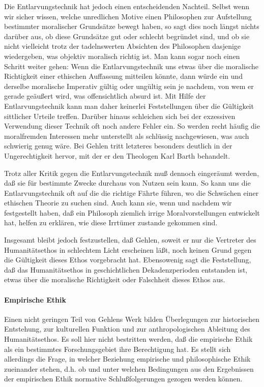 \documentclass[12pt,a4paper]{article}
\begin{document}
Die Entlarvungstechnik hat jedoch einen entscheidenden Nachteil. Selbst
wenn wir sicher wissen, welche unredlichen Motive einen Philosophen zur
Aufstellung bestimmter moralischer Grundsätze bewegt haben, so sagt dies
noch längst nichts darüber aus, ob diese Grundsätze gut oder schlecht
begründet sind, und ob sie nicht vielleicht trotz der tadelnswerten
Absichten des Philosophen dasjenige wiedergeben, was objektiv moralisch
richtig ist. Man kann sogar noch einen Schritt weiter gehen: Wenn die
Entlarvungstechnik uns etwas über die moralische Richtigkeit einer
ethischen Auffassung mitteilen könnte, dann würde ein und derselbe
moralische Imperativ gültig oder ungültig sein je nachdem, von wem er
gerade geäußert wird, was offensichtlich absurd ist. Mit Hilfe der
Entlarvungstechnik kann man daher keinerlei Feststellungen über die
Gültigkeit sittlicher Urteile treffen.  Darüber hinaus schleichen sich
bei der exzessiven Verwendung dieser Technik oft noch andere Fehler ein.
So werden recht häufig die moralfremden Interessen mehr unterstellt als
schlüssig nachgewiesen, was auch schwierig genug wäre. Bei Gehlen tritt
letzteres besonders deutlich in der Ungerechtigkeit hervor, mit der er
den Theologen Karl Barth behandelt.

Trotz aller Kritik gegen die Entlarvungstechnik muß dennoch eingeräumt
werden, daß sie für bestimmte Zwecke durchaus von Nutzen sein kann. So kann
uns die Entlarvungstechnik oft auf die die richtige Fährte führen, wo die
Schwächen einer ethischen Theorie zu suchen sind. Auch kann sie, wenn und
nachdem wir festgestellt haben, daß ein Philosoph ziemlich irrige
Moralvorstellungen entwickelt hat, helfen zu erklären, wie diese Irrtümer
zustande gekommen sind.

Insgesamt bleibt jedoch festzustellen, daß Gehlen, soweit er nur die
Vertreter des Humanitätsethos in schlechtem Licht erscheinen läßt, noch
keinen Grund gegen die Gültigkeit dieses Ethos vorgebracht hat. Ebensowenig
sagt die Feststellung, daß das Humanitätsethos in geschichtlichen
Dekadenzperioden entstanden ist, etwas über die moralische Richtigkeit oder
Falschheit dieses Ethos aus.

\paragraph{Empirische Ethik} Einen nicht geringen
Teil von Gehlens Werk bilden Überlegungen zur historischen Entstehung, zur
kulturellen Funktion und zur anthropologischen Ableitung des Humanitätsethos.
Es soll hier nicht bestritten werden, daß die empirische Ethik als ein
bestimmtes Forschungsgebiet ihre Berechtigung hat. Es stellt sich allerdings
die Frage, in welcher Beziehung empirische und philosophische Ethik zueinander
stehen, d.h. ob und unter welchen Bedingungen aus den Ergebnissen der
empirischen Ethik normative Schlußfolgerungen gezogen werden können.
\end{document}
